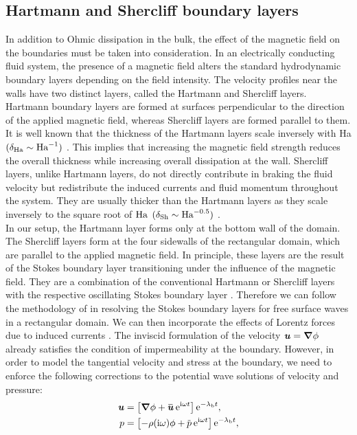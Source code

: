 \documentclass[aps,prfluids,reprint,superscriptaddress]{revtex4-2}
\newcommand{\h}[1]{\textbf{\textit{#1}}}
\newcommand{\ii}[1]{\text{#1}}
\newcommand{\overbar}[1]{\mkern 1.5mu\overline{\mkern-2mu#1\mkern-2mu}\mkern 1.5mu}
\renewcommand{\textrm}{\rm}
\begin{document}
\subsection{Hartmann and Shercliff boundary layers}
\label{sec:hartmann_and_shercliff}

In addition to Ohmic dissipation in the bulk, the effect of the magnetic field on the boundaries must be taken into consideration. In an electrically conducting fluid system, the presence of a magnetic field alters the standard hydrodynamic boundary layers depending on the field intensity. The velocity profiles near the walls have two distinct layers, called the Hartmann and Shercliff layers. Hartmann boundary layers are formed at surfaces perpendicular to the direction of the applied magnetic field, whereas Shercliff layers are formed parallel to them. It is well known that the thickness of the Hartmann layers scale inversely with Ha $(\delta_{\rm Ha} \sim \textrm{Ha}^{-1})$ \cite{Hartmann, shercliff1981, Muller2001}. This implies that increasing the magnetic field strength reduces the overall thickness while increasing overall dissipation at the wall. Shercliff layers, unlike Hartmann layers, do not directly contribute in braking the fluid velocity but redistribute the induced currents and fluid momentum throughout the system. They are usually thicker than the Hartmann layers as they scale inversely to the square root of $\rm Ha$ $(\delta_{\rm Sh} \sim \textrm{Ha}^{-0.5})$ \cite{shercliff1981}. 
\\
\indent In our setup, the Hartmann layer forms only at the bottom wall of the domain. The Shercliff layers form at the four sidewalls of the rectangular domain, which are parallel to the applied magnetic field. In principle, these layers are the result of the Stokes boundary layer transitioning under the influence of the magnetic field. They are a combination of the conventional Hartmann or Shercliff layers with the respective oscillating Stokes boundary layer \cite{Sreenivasan2005}. Therefore we can follow the methodology of \citet{Keulegan1959} in resolving the Stokes boundary layers for free surface waves in a rectangular domain. We can then incorporate the effects of Lorentz forces due to induced currents \cite{Davidson2001}. The inviscid formulation of the velocity $\h u=\bm\nabla\phi$ already satisfies the condition of impermeability at the boundary. However, in order to model the tangential velocity and stress at the boundary, we need to enforce the following corrections to the potential wave solutions of velocity and pressure:
\begin{subequations}
\begin{align}
	\h u &= \left[\bm\nabla\phi
	 + {\overbar{\h u}}\:  \ii e^{ \ii{i}\omega t} \right]\ii e^{-\lambda_{\ii b}t},
	 \label{eq:velocity_correction}
	\\
	p &=  \left[ -\rho(\ii i\omega)\phi
	+ {\overbar{p}}\:  \ii e^{ \ii{i}\omega t}
	\right]\ii e^{-\lambda_{\ii b}t},
	\label{eq:pressure_correction}
\end{align}
\end{subequations}
\end{document}

